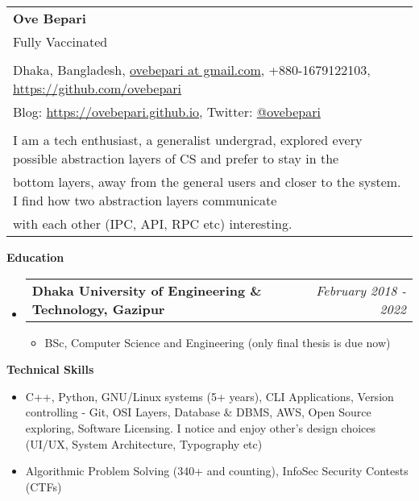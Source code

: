 \documentclass[legalpaper,10pt]{article}
\makeatletter
\newcommand{\resheading}[1]{{\large \colorbox{mygrey}{\begin{minipage}{\textwidth}{\textbf{#1 \vphantom{p\^{E}}}}\end{minipage}}}}
\newcommand{\ressubheading}[4]{
	\begin{tabular*}{7.1in}{l@{\extracolsep{\fill}}r}
		\textbf{#1} & \textit{#4} \\
	\end{tabular*}\vspace{-6pt}}
\makeatother
\begin{document}
	
	\begin{tabular*}{7.5in}{l@{\extracolsep{\fill}}}
		\textbf{\large Ove Bepari}\\
		{\scriptsize Fully Vaccinated}
		\\
		\\
		Dhaka, Bangladesh, \href{mailto:ovebepari@gmail.com}{ovebepari at gmail.com}, +880-1679122103, \url{https://github.com/ovebepari} \\
		 Blog: \url{https://ovebepari.github.io}, Twitter: \href{https://twitter.com/ovebepari}{@ovebepari}
		\\
		\\
		I am a tech enthusiast, a generalist undergrad, explored every possible abstraction layers of CS and prefer to stay in the\\bottom layers, away from the general users and closer to the system. I find how two abstraction layers communicate\\with each other (IPC, API, RPC etc) interesting.
	\end{tabular*}
	
	\vspace{0.25in}
	
	\resheading{Education}
	\begin{itemize}
	
		\item \ressubheading{Dhaka University of Engineering \& Technology, Gazipur}{}{}{February 2018 - 2022}
		\begin{itemize}
			\item BSc, Computer Science and Engineering (only final thesis is due now)
		\end{itemize}
	
	\end{itemize}
	
	\vspace{0.15in}
	
	\resheading{Technical Skills}
	\begin{itemize}
		\item C++, Python, GNU/Linux systems (5+ years), CLI Applications, Version controlling - Git, OSI Layers, Database \& DBMS, AWS, Open Source exploring, Software Licensing. I notice and enjoy other's design choices (UI/UX, System Architecture, Typography etc)
		\item Algorithmic Problem Solving (340+ and counting), InfoSec Security Contests (CTFs)
	\end{itemize}

	\vspace{0.15in}
	
\end{document}
